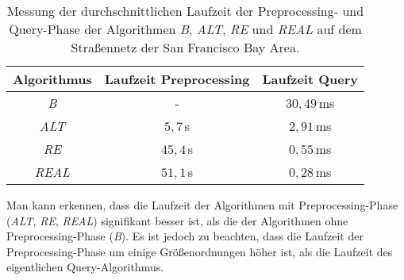 \begin{table}[h] %
	\centering %
	\def\arraystretch{1.5}
	\begin{tabular}{|c| c| c|}
		\hline %
		\: \: \textbf{Algorithmus} \: \: & \: \: \textbf{Laufzeit Preprocessing} \: \: & \: \: \textbf{Laufzeit Query} \: \: \\
		\hline %
		\textit{B} & - & $30,49$\,ms  \\
		\textit{ALT} & $5,7$\,s & $2,91$\,ms  \\
		\textit{RE} & $45,4$\,s & $0,55$\,ms  \\
		\textit{REAL} & $51,1$\,s & $0,28$\,ms  \\
		\hline %
	\end{tabular}
	\caption{Messung der durchschnittlichen Laufzeit der Preprocessing- und Query-Phase der Algorithmen \textit{B}, \textit{ALT}, \textit{RE} und \textit{REAL} auf dem Straßennetz der San Francisco Bay Area.} %
	\label{tab:Experimentelle Analyse} %
\end{table} %

Man kann erkennen, dass die Laufzeit der Algorithmen mit Preprocessing-Phase (\textit{ALT}, \textit{RE}, \textit{REAL}) signifikant besser ist, als die der Algorithmen ohne Preprocessing-Phase (\textit{B}). Es ist jedoch zu beachten, dass die Laufzeit der Preprocessing-Phase um einige Größenordnungen höher ist, als die Laufzeit des eigentlichen Query-Algorithmus.



